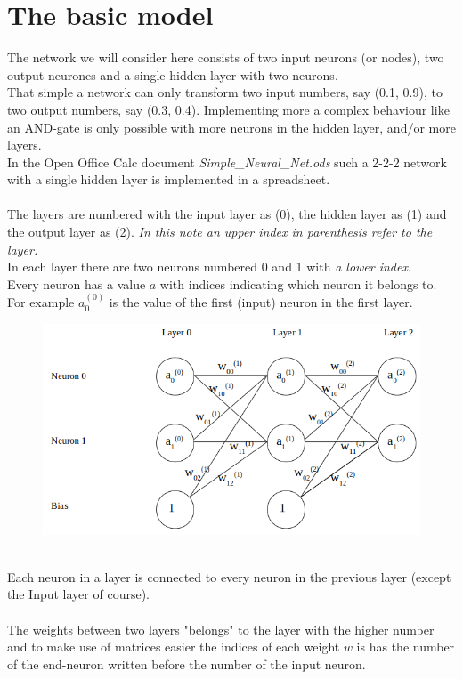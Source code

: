 \documentclass{article}
\begin{document}
\section*{The basic model}
The network we will consider here consists of two input neurons (or nodes), two output neurones and a single hidden layer with two neurons.
\\
That simple a network can only transform two input numbers, say (0.1, 0.9), to two output numbers, say (0.3, 0.4). Implementing more a complex behaviour like an AND-gate is only possible with more neurons in the hidden layer, and/or more layers.
\\In the Open Office Calc document \textit{Simple\_Neural\_Net.ods} such a 2-2-2 network with a single hidden layer is implemented in a spreadsheet.
\\
\\
The layers are numbered with the input layer as (0), the hidden layer as (1) and the output layer as (2). \textit{In this note an upper index in parenthesis refer to the layer.}
\\
In each layer there are two neurons numbered 0 and 1 with \textit{a lower index}.
\\
Every neuron has a value $a$ with indices indicating which neuron it belongs to.
\\
For example $a_0^{(0)}$ is the value of the first (input) neuron in the first layer.
\begin{figure}[h]
\includegraphics[scale=.4]{two_neuron_net}
\centering
\end{figure}
\\
Each neuron in a layer is connected to every neuron in the previous layer (except the Input layer of course).\\
\\
The weights between two layers "belongs" to the layer with the higher number and to make use of matrices easier the indices of each weight $w$ is has the number of the end-neuron written before the number of the input neuron.
\end{document}

